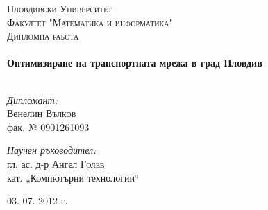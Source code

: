 
\begin{titlepage}

\begin{center}

\textsc{\huge Пловдивски Университет}\\[1.5cm]
\textsc{\LARGE Факултет "Математика и информатика"}\\[1.0cm]

\textsc{\Large Дипломна работа}\\[0.5cm]

\HRule \\[0.4cm]
{ \huge \bfseries Оптимизиране на транспортната мрежа в град Пловдив}\\[0.4cm]

\HRule \\[1.5cm]

\begin{minipage}{0.4\textwidth}
\begin{flushleft} \large
\emph{Дипломант:}\\
Венелин \textsc{Вълков} \\
\small
фак. № 0901261093
\end{flushleft}
\end{minipage}
\begin{minipage}{0.4\textwidth}
\begin{flushright} \large
\emph{Научен ръководител:} \\
гл. ас. д-р Ангел \textsc{Голев} \\
\small
кат. \nolinebreak[4] „Компютърни \nolinebreak[4] технологии“ 
\end{flushright}
\end{minipage}

\vfill

{\large 03. 07. 2012 г.}

\end{center}

\end{titlepage}